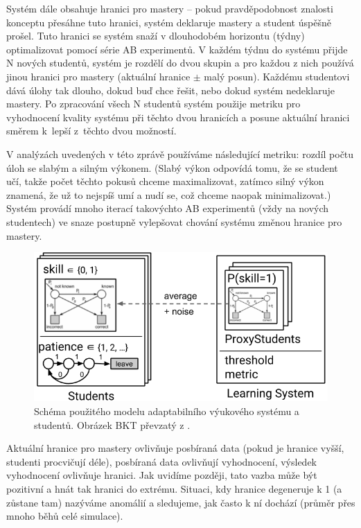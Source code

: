 \documentclass[twocolumn,10pt,cleanfoot]{asme2ej}
\begin{document}
Systém dále obsahuje hranici pro mastery -- pokud pravděpodobnost znalosti konceptu přesáhne tuto hranici, systém deklaruje mastery a student úspěšně prošel. Tuto hranici se systém snaží v dlouhodobém horizontu (týdny) optimalizovat pomocí série AB experimentů. V každém týdnu do systému přijde N nových studentů, systém je rozdělí do dvou skupin a pro každou z nich používá jinou hranici pro mastery (aktuální hranice $\pm$ malý posun). Každému studentovi dává úlohy tak dlouho, dokud buď chce řešit, nebo dokud systém nedeklaruje mastery. Po zpracování všech N studentů systém použije metriku pro vyhodnocení kvality systému při těchto dvou hranicích a posune aktuální hranici směrem k~lepší z~těchto dvou možností.

V analýzách uvedených v této zprávě používáme následující metriku: rozdíl počtu úloh se slabým a silným výkonem. (Slabý výkon odpovídá tomu, že se student učí, takže počet těchto pokusů chceme maximalizovat, zatímco silný výkon znamená, že už to nejspíš umí a nudí se, což chceme naopak minimalizovat.) Systém provádí mnoho iterací takovýchto AB experimentů (vždy na nových studentech) ve snaze postupně vylepšovat chování systému změnou hranice pro mastery.

\begin{figure}[htb]
\centering
\includegraphics[width=\columnwidth]{img/model}
\caption{Schéma použitého modelu adaptabilního výukového systému a studentů.
  Obrázek BKT převzatý z \cite{bkt-logistic-overview}.}
\label{fig:model}
\end{figure}

Aktuální hranice pro mastery ovlivňuje posbíraná data (pokud je hranice vyšší, studenti procvičují déle), posbíraná data ovlivňují vyhodnocení, výsledek vyhodnocení ovlivňuje hranici. Jak uvidíme později, tato vazba může být pozitivní a hnát tak hranici do extrému. Situaci, kdy hranice degeneruje k 1 (a zůstane tam) nazýváme anomálií a sledujeme, jak často k ní dochází (průměr přes mnoho běhů celé simulace).
\end{document}
